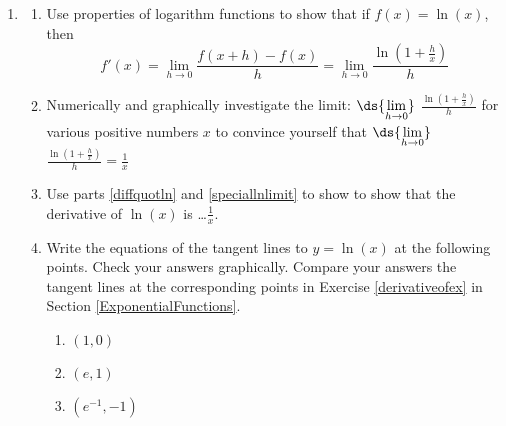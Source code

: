 \documentclass{ximera}
\begin{document}
\begin{enumerate}
\setcounter{enumi}{\value{HW}}



\item\label{derivativeofln} \begin{enumerate}  \item\label{diffquotln}  Use properties of logarithm functions to show that if $f(x) = \ln(x)$, then \[ f'(x) = \lim_{h \rightarrow 0} \frac{f(x+h) - f(x)}{h} = \lim_{h \rightarrow 0} \dfrac{\ln\left( 1 + \frac{h}{x} \right)}{h} \]

\item\label{speciallnlimit}    Numerically and graphically investigate the limit: $\ds{\lim_{h \rightarrow 0}}$ $\frac{\ln\left( 1 + \frac{h}{x} \right)}{h}$ for various positive numbers $x$ to convince yourself that   $\ds{\lim_{h \rightarrow 0}}$ $\frac{\ln\left( 1 + \frac{h}{x} \right)}{h} = \frac{1}{x}$

\item  Use parts \ref{diffquotln} and \ref{speciallnlimit} to show to show that the derivative of $\ln(x)$ is \ldots  $\frac{1}{x}$.

\item  Write the equations of the tangent lines to $y = \ln(x) $ at the following points.   Check your answers graphically.  Compare your answers the tangent lines at the corresponding points in Exercise \ref{derivativeofex} in Section \ref{ExponentialFunctions}.



\begin{multicols}{3}
\begin{enumerate}

\item  $(1,0)$

\item  $(e, 1)$

\item $\left(e^{-1}, -1 \right)$

\end{enumerate}
\end{multicols}

\end{enumerate}

\setcounter{HW}{\value{enumi}}
\end{enumerate}
\end{document}
